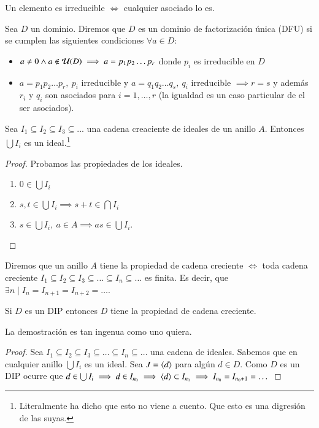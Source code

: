 \begin{obs}
	Un elemento es irreducible $\iff$ cualquier asociado lo es.
\end{obs}

\begin{dfn}
	Sea $D$ un dominio. Diremos que $D$ es un dominio de factorización única (DFU) si se cumplen las siguientes condiciones $\forall a \in D$:
	\begin{itemize}
		\item $a \neq 0 \land a \not\in\mathcal{U}(D) \implies a = p_1p_2\dots p_r$ donde $p_i$ es irreducible en $D$
		\item $a = p_1p_2\dots p_r,\ p_i$ irreducible y $a = q_1q_2 \dots q_s,\ q_i$ irreducible $\implies r = s$ y además $r_i$ y $q_i$ son asociados para $i = 1, \dots, r$ (la igualdad es un caso particular de el ser asociados).
	\end{itemize}
\end{dfn}

\begin{obs}
	Sea $I_1 \subseteq I_2 \subseteq I_3 \subseteq ...$ una cadena creaciente de ideales de un anillo $A$. Entonces $\bigcup I_i$ es un ideal.\footnote{Literalmente ha dicho que esto no viene a cuento. Que esto es una digresión de las suyas.}
\end{obs}

\begin{proof}
	Probamos las propiedades de los ideales.
	\begin{enumerate}
		\item $0 \in \bigcup I_i$
		\item $s,t \in \bigcup I_i \implies s+t \in \bigcap I_i$
		\item $s \in \bigcup I_i,\ a \in A \implies as \in \bigcup I_i$.
	\end{enumerate}
\end{proof}

\begin{dfn}
	
	Diremos que un anillo $A$ tiene la propiedad de cadena creciente $\iff$ toda cadena creciente $I_1 \subseteq I_2 \subseteq I_3 \subseteq \dots \subseteq I_n \subseteq \dots$ es finita. Es decir, que $\exists n \mid I_n = I_{n+1} = I_{n+2} = \dots$.
\end{dfn}

\begin{thm}
	Si $D$ es un DIP entonces $D$ tiene la propiedad de cadena creciente.
\end{thm}

La demostración es tan ingenua como uno quiera.

\begin{proof}
	Sea $I_1 \subseteq I_2 \subseteq I_3 \subseteq \dots \subseteq I_n \subseteq \dots$ una cadena de ideales. Sabemos que en cualquier anillo $\bigcup I_i$ es un ideal. Sea $J = \langle d\rangle$ para algún $d \in D$. Como $D$ es un DIP ocurre que $d \in \bigcup I_i \implies d \in I_{n_0} \implies \langle d\rangle \subset I_{n_0} \implies I_{n_0} = I_{n_0 + 1} = \dots$
\end{proof}